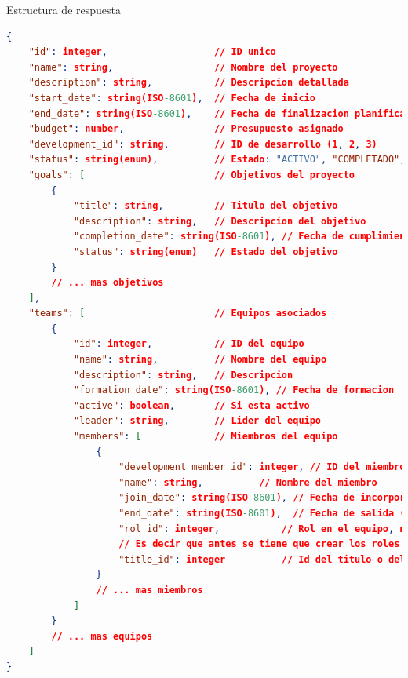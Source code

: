 \documentclass[11pt,a4paper]{article}
\begin{document}
\begin{center}
	\begin{minipage}{\textwidth}
		\begin{codebox}{Estructura de respuesta}
			\begin{lstlisting}[language=json]
{
    "id": integer,                   // ID unico
    "name": string,                  // Nombre del proyecto
    "description": string,           // Descripcion detallada
    "start_date": string(ISO-8601),  // Fecha de inicio
    "end_date": string(ISO-8601),    // Fecha de finalizacion planificada
    "budget": number,                // Presupuesto asignado
    "development_id": string,        // ID de desarrollo (1, 2, 3)
    "status": string(enum),          // Estado: "ACTIVO", "COMPLETADO", "EN_PAUSA", "CANCELADO"
    "goals": [                       // Objetivos del proyecto
        {
            "title": string,         // Titulo del objetivo
            "description": string,   // Descripcion del objetivo
            "completion_date": string(ISO-8601), // Fecha de cumplimiento
            "status": string(enum)   // Estado del objetivo
        }
        // ... mas objetivos
    ],
    "teams": [                       // Equipos asociados
        {
            "id": integer,           // ID del equipo
            "name": string,          // Nombre del equipo
            "description": string,   // Descripcion
            "formation_date": string(ISO-8601), // Fecha de formacion
            "active": boolean,       // Si esta activo
            "leader": string,        // Lider del equipo
            "members": [             // Miembros del equipo
                {
                    "development_member_id": integer, // ID del miembro
                    "name": string,          // Nombre del miembro
                    "join_date": string(ISO-8601), // Fecha de incorporacion
                    "end_date": string(ISO-8601),  // Fecha de salida (o null)
                    "rol_id": integer,           // Rol en el equipo, necesitamos el id | 
                    // Es decir que antes se tiene que crear los roles
                    "title_id": integer          // Id del titulo o del cargo. 
                }
                // ... mas miembros
            ]
        }
        // ... mas equipos
    ]
}
\end{lstlisting}
		\end{codebox}
	\end{minipage}
\end{center}
\end{document}

